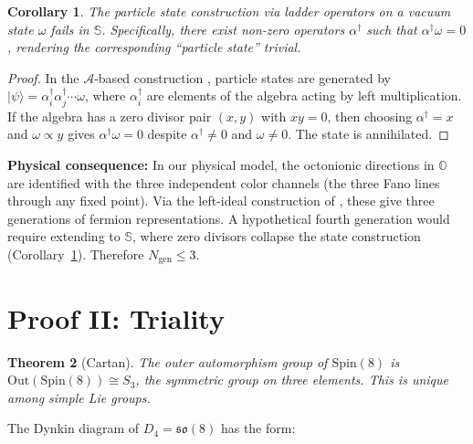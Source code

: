 \documentclass[12pt,a4paper]{article}
\newtheorem{theorem}{Theorem}
\newtheorem{corollary}[theorem]{Corollary}
\theoremstyle{definition}
\theoremstyle{remark}
\newcommand{\Oct}{\mathbb{O}}
\newcommand{\Sed}{\mathbb{S}}
\newcommand{\Alg}{\mathcal{A}}
\newcommand{\Out}{\mathrm{Out}}
\newcommand{\Spin}{\mathrm{Spin}}
\begin{document}
\begin{corollary}
\label{cor:noladder}
The particle state construction via ladder operators on a vacuum state $\omega$ 
fails in $\Sed$. Specifically, there exist non-zero operators $\alpha^\dagger$ 
such that $\alpha^\dagger \omega = 0$, rendering the corresponding ``particle 
state'' trivial.
\end{corollary}

\begin{proof}
In the $\Alg$-based construction \cite{Furey2016}, particle states are generated by 
$|\psi\rangle = \alpha_i^\dagger \alpha_j^\dagger \cdots \omega$, where 
$\alpha_i^\dagger$ are elements of the algebra acting by left multiplication. If 
the algebra has a zero divisor pair $(x, y)$ with $xy = 0$, then choosing 
$\alpha^\dagger = x$ and $\omega \propto y$ gives $\alpha^\dagger \omega = 0$ despite 
$\alpha^\dagger \neq 0$ and $\omega \neq 0$. The state is annihilated.
\end{proof}

\textbf{Physical consequence:} In our physical model, the octonionic directions 
in $\Oct$ are identified with the three independent color channels (the three 
Fano lines through any fixed point). Via the left-ideal construction of 
\cite{Furey2016}, these give three generations of fermion representations. 
A hypothetical fourth generation would require extending to $\Sed$, where 
zero divisors collapse the state construction (Corollary~\ref{cor:noladder}). 
Therefore $N_{\mathrm{gen}} \leq 3$.

\section{Proof II: Triality}
\label{sec:triality}

\begin{theorem}[Cartan]
The outer automorphism group of $\Spin(8)$ is $\Out(\Spin(8)) \cong S_3$, 
the symmetric group on three elements. This is unique among simple Lie groups.
\end{theorem}

The Dynkin diagram of $D_4 = \mathfrak{so}(8)$ has the form:
\begin{center}
\end{center}
\end{document}
